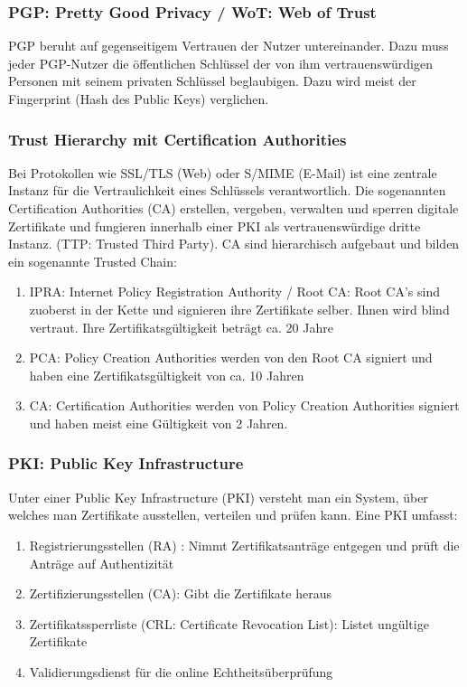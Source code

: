 \subsubsection{PGP: Pretty Good Privacy / WoT: Web of Trust}
PGP beruht auf gegenseitigem Vertrauen der Nutzer untereinander. Dazu muss jeder PGP-Nutzer die öffentlichen Schlüssel der von ihm vertrauenswürdigen Personen mit seinem privaten Schlüssel beglaubigen. Dazu wird meist der Fingerprint (Hash des Public Keys) verglichen.

\subsubsection{Trust Hierarchy mit Certification Authorities}
Bei Protokollen wie SSL/TLS (Web) oder S/MIME (E-Mail) ist eine zentrale Instanz für die Vertraulichkeit eines Schlüssels verantwortlich. Die sogenannten Certification Authorities (CA) erstellen, vergeben, verwalten und sperren digitale Zertifikate und fungieren innerhalb einer PKI als vertrauenswürdige dritte Instanz. (TTP: Trusted Third Party). CA sind hierarchisch aufgebaut und bilden ein sogenannte Trusted Chain:
\begin{enumerate}
	\item IPRA: Internet Policy Registration Authority / Root CA: Root CA's sind zuoberst in der Kette und signieren ihre Zertifikate selber. Ihnen wird blind vertraut. Ihre Zertifikatsgültigkeit beträgt ca. 20 Jahre
	\item PCA: Policy Creation Authorities werden von den Root CA signiert und haben eine Zertifikatsgültigkeit von ca. 10 Jahren
	\item CA: Certification Authorities werden von Policy Creation Authorities signiert und haben meist eine Gültigkeit von 2 Jahren. 
\end{enumerate}

\subsubsection{PKI: Public Key Infrastructure}
Unter einer Public Key Infrastructure (PKI) versteht man ein System, über welches man Zertifikate ausstellen, verteilen und prüfen kann. Eine PKI umfasst:
\begin{enumerate}
	\item Registrierungsstellen (RA) : Nimmt Zertifikatsanträge entgegen und prüft die Anträge auf Authentizität
	\item Zertifizierungsstellen (CA): Gibt die Zertifikate heraus
	\item Zertifikatssperrliste (CRL: Certificate Revocation List): Listet ungültige Zertifikate
	\item Validierungsdienst für die online Echtheitsüberprüfung
\end{enumerate}

